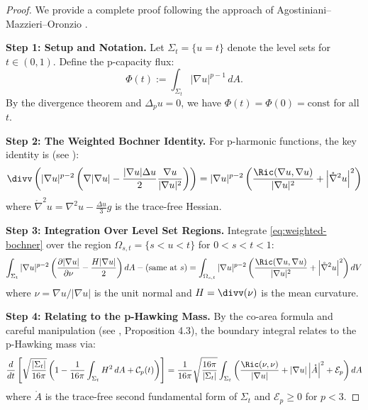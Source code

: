 \begin{proof}
We provide a complete proof following the approach of Agostiniani--Mazzieri--Oronzio \cite{amo2022}.

\textbf{Step 1: Setup and Notation.}
Let $\Sigma_t = \{u = t\}$ denote the level sets for $t \in (0,1)$. Define the p-capacity flux:
\begin{equation}
\Phi(t) := \int_{\Sigma_t} |\nabla u|^{p-1} \, dA.
\end{equation}
By the divergence theorem and $\Delta_p u = 0$, we have $\Phi(t) = \Phi(0) = \text{const}$ for all $t$.

\textbf{Step 2: The Weighted Bochner Identity.}
For p-harmonic functions, the key identity is (see \cite{kotschwar2009,amo2022}):
\begin{equation}\label{eq:weighted-bochner}
\divv\left(|\nabla u|^{p-2}\left(\nabla|\nabla u| - \frac{|\nabla u| \Delta u}{2}\frac{\nabla u}{|\nabla u|^2}\right)\right) = |\nabla u|^{p-2}\left(\frac{\Ric(\nabla u, \nabla u)}{|\nabla u|^2} + \left|\mathring{\nabla}^2 u\right|^2\right)
\end{equation}
where $\mathring{\nabla}^2 u = \nabla^2 u - \frac{\Delta u}{3}g$ is the trace-free Hessian.

\textbf{Step 3: Integration Over Level Set Regions.}
Integrate \eqref{eq:weighted-bochner} over the region $\Omega_{s,t} = \{s < u < t\}$ for $0 < s < t < 1$:
\begin{equation}
\int_{\Sigma_t} |\nabla u|^{p-2}\left(\frac{\partial |\nabla u|}{\partial \nu} - \frac{H|\nabla u|}{2}\right) dA - (\text{same at } s) = \int_{\Omega_{s,t}} |\nabla u|^{p-2}\left(\frac{\Ric(\nabla u, \nabla u)}{|\nabla u|^2} + \left|\mathring{\nabla}^2 u\right|^2\right) dV
\end{equation}
where $\nu = \nabla u/|\nabla u|$ is the unit normal and $H = \divv(\nu)$ is the mean curvature.

\textbf{Step 4: Relating to the p-Hawking Mass.}
By the co-area formula and careful manipulation (see \cite{amo2022}, Proposition 4.3), the boundary integral relates to the p-Hawking mass via:
\begin{equation}
\frac{d}{dt}\left[\sqrt{\frac{|\Sigma_t|}{16\pi}}\left(1 - \frac{1}{16\pi}\int_{\Sigma_t} H^2 \, dA + \mathcal{C}_p(t)\right)\right] = \frac{1}{16\pi}\sqrt{\frac{16\pi}{|\Sigma_t|}}\int_{\Sigma_t}\left(\frac{\Ric(\nu,\nu)}{|\nabla u|} + |\nabla u|\left|\mathring{A}\right|^2 + \mathcal{E}_p\right)dA
\end{equation}
where $\mathring{A}$ is the trace-free second fundamental form of $\Sigma_t$ and $\mathcal{E}_p \geq 0$ for $p < 3$.


\end{proof}
